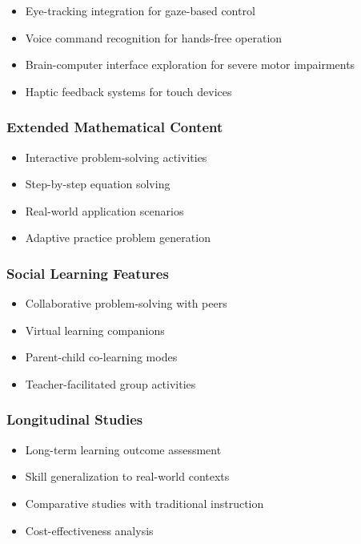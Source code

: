 \documentclass[12pt, a4paper]{article}
\begin{document}
\begin{itemize}[leftmargin=*]
    \item Eye-tracking integration for gaze-based control
    \item Voice command recognition for hands-free operation
    \item Brain-computer interface exploration for severe motor impairments
    \item Haptic feedback systems for touch devices
\end{itemize}

\subsubsection{Extended Mathematical Content}

\begin{itemize}[leftmargin=*]
    \item Interactive problem-solving activities
    \item Step-by-step equation solving
    \item Real-world application scenarios
    \item Adaptive practice problem generation
\end{itemize}

\subsubsection{Social Learning Features}

\begin{itemize}[leftmargin=*]
    \item Collaborative problem-solving with peers
    \item Virtual learning companions
    \item Parent-child co-learning modes
    \item Teacher-facilitated group activities
\end{itemize}

\subsubsection{Longitudinal Studies}

\begin{itemize}[leftmargin=*]
    \item Long-term learning outcome assessment
    \item Skill generalization to real-world contexts
    \item Comparative studies with traditional instruction
    \item Cost-effectiveness analysis
\end{itemize}
\end{document}
